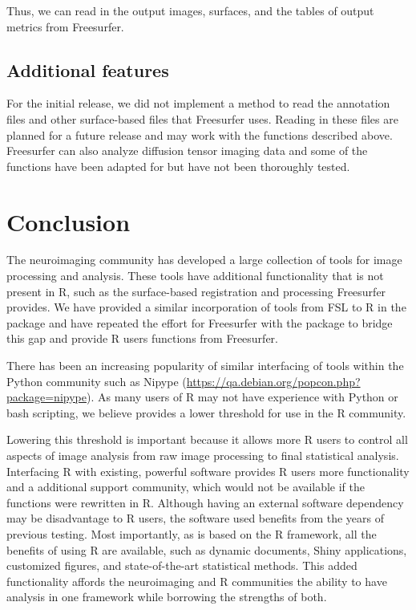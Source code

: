 Thus, we can read in the output images, surfaces, and the tables of
output metrics from Freesurfer.

\subsection{Additional features}\label{additional-features}

For the initial release, we did not implement a method to read the
annotation files and other surface-based files that Freesurfer uses.
Reading in these files are planned for a future release and may work
with the functions described above. Freesurfer can also analyze
diffusion tensor imaging data and some of the functions have been
adapted for  but have not been thoroughly tested.

\section{Conclusion}\label{conclusion}

The neuroimaging community has developed a large collection of tools for
image processing and analysis. These tools have additional functionality
that is not present in R, such as the surface-based registration and
processing Freesurfer provides. We have provided a similar incorporation
of tools from FSL to R in the  package and have repeated the
effort for Freesurfer with the  package to bridge this
gap and provide R users functions from Freesurfer.

There has been an increasing popularity of similar interfacing of tools
within the Python community such as Nipype
\citep{gorgolewski_nipype:_2011}
(\url{https://qa.debian.org/popcon.php?package=nipype}). As many users
of R may not have experience with Python or bash scripting, we believe
 provides a lower threshold for use in the R community.

Lowering this threshold is important because it allows more R users to
control all aspects of image analysis from raw image processing to final
statistical analysis. Interfacing R with existing, powerful software
provides R users more functionality and a additional support community,
which would not be available if the functions were rewritten in R.
Although having an external software dependency may be disadvantage to R
users, the software used benefits from the years of previous testing.
Most importantly, as  is based on the R framework, all
the benefits of using R are available, such as dynamic documents, Shiny
applications, customized figures, and state-of-the-art statistical
methods. This added functionality affords the neuroimaging and R
communities the ability to have analysis in one framework while
borrowing the strengths of both.

